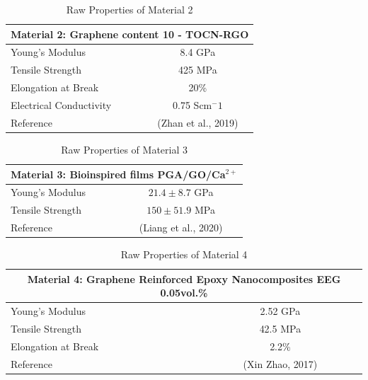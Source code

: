 \documentclass[a4paper,12pt]{article}
\numberwithin{equation}{section}
\numberwithin{figure}{section}
\begin{document}
\begin{table}[hbt!]
\centering
\caption{Raw Properties of Material 2}
\begin{tabular}{|l|c|}
\hline
\multicolumn{2}{|c|}{\textbf{Material 2: Graphene content 10 - TOCN-RGO}} \\ \hline
Young's Modulus                       & 8.4 GPa                           \\ \hline
Tensile Strength                      & 425 MPa                           \\ \hline
Elongation at Break                   & 20\%                              \\ \hline
Electrical Conductivity               & 0.75 Scm$^-1$                     \\ \hline
Reference                             & (Zhan et al., 2019)               \\ \hline
\end{tabular}
\end{table}

\begin{table}[hbt!]
\centering
\caption{Raw Properties of Material 3}
\begin{tabular}{|l|c|}
\hline
\multicolumn{2}{|c|}{\textbf{Material 3: Bioinspired films PGA/GO/Ca$^{2+}$}} \\ \hline
Young's Modulus  & $21.4\pm{8.7}$ GPa \\ \hline
Tensile Strength & $150\pm51.9$ MPa   \\ \hline
Reference        & (Liang et al., 2020)   \\ \hline
\end{tabular}
\end{table}

\FloatBarrier
\begin{table}[hbt!]
\centering
\caption{Raw Properties of Material 4}
\begin{tabular}{|l|c|}
\hline
\multicolumn{2}{|c|}{\textbf{Material 4: Graphene Reinforced Epoxy Nanocomposites EEG 0.05vol.\%}} \\ \hline
Young's Modulus     & 2.52 GPa         \\ \hline
Tensile Strength    & 42.5 MPa         \\ \hline
Elongation at Break & 2.2\%            \\ \hline
Reference           & (Xin Zhao, 2017) \\ \hline
\end{tabular}
\end{table}
\FloatBarrier
\end{document}
